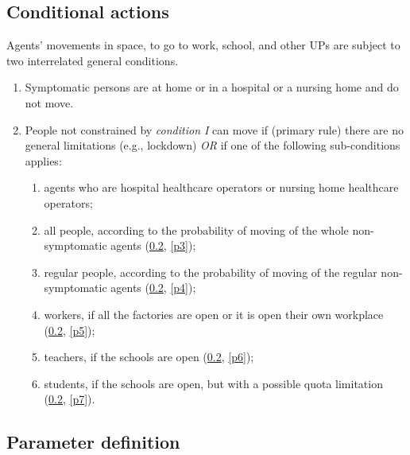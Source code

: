 \documentclass[graybox]{svmult}
\begin{document}
\subsection{Conditional actions}
\label{cond}

Agents' movements in space, to go to work, school, and other UPs are subject to two interrelated general conditions.

\begin{enumerate}[label=\Roman*]

\item Symptomatic persons are at home or in a hospital or a nursing home and do not move. 

\item People not constrained by \emph{condition I} can move if (primary rule) there are no general limitations (e.g., lockdown) \emph{OR} if one of the following sub-conditions applies:

\begin{enumerate}
\item agents who are hospital healthcare operators or nursing home healthcare operators;

\item all people, according to the probability of moving of the whole non-symptomatic agents (\ref{par}, \ref{p3});

\item regular people, according to the probability of moving of the regular non-symptomatic agents
(\ref{par}, \ref{p4});

\item workers, if all the factories are open or it is open their own workplace
(\ref{par}, \ref{p5});

\item teachers, if the schools are open
(\ref{par}, \ref{p6});

\item students, if the schools are open, but with a possible quota limitation
(\ref{par}, \ref{p7}).

\end{enumerate}

\end{enumerate}


\subsection{Parameter definition}
\label{par}
\end{document}
